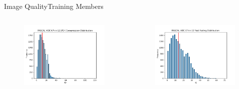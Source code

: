 \begin{frame}{Image Quality}{Training Members}
\begin{columns}
    \vspace{-0.5cm}
      \begin{figure}
        \includegraphics[width=0.5 \textwidth]{figs/JP2KCompressiondistred.pdf}
    \end{figure}
    \vspace{-0.5cm}
    \begin{figure}
        \includegraphics[width=0.5 \textwidth]{figs/FastFadingdistred.pdf}
    \end{figure}
    \end{columns}
\end{frame}


